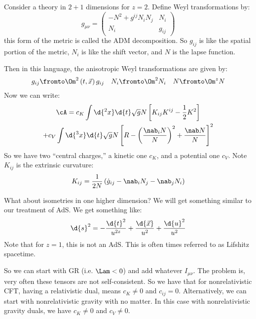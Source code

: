 \documentclass{booc}
\begin{document}
\begin{exm}
Consider a theory in $2+1$ dimensions for $z = 2$. 
Define Weyl transformations by:
\begin{equation}
g_{\mu\nu}= 
\begin{pmatrix}
-N^2 + g^{ij} N_i N_j & N_i \\
N_i & g_{ij}
\end{pmatrix}
\end{equation}
this form of the metric is called the ADM decomposition.
So $g_{ij}$ is like the spatial portion of the metric, $N_i$ is like the shift vector,
and $N$ is the lapse function.

Then in this language, the anisotropic Weyl transformations are given by:
\begin{align}
g_{ij} \fromto \Om^2\left( t , \vec{x} \right) g_{ij}
&&
N_i \fromto \Om^2 N_i 
&&
N \fromto \Om^z N
\end{align}
Now we can write:
\begin{multline*}
\cA = c_K \int \d{^2 x} \d{t} \sqrt{g} N \left[ K_{ij} K^{ij} - \frac{1}{2} K^2 \right] \\
+ c_V \int \d{^3 x} \d{t}\sqrt{g}N\left[ R - \left( \frac{\nab _i N}{N} \right)^2 + 
\frac{\nab N}{N}\right]^2
\end{multline*}
So we have two ``central charges,'' a kinetic one $c_K$, and a potential one $c_V$.
Note $K_{ij}$ is the extrinsic curvature:
\begin{equation}
K_{ij} = \frac{1}{2N} \left( \dot g_{ij} - \nab_i N_j - \nab_j N_i \right)
\end{equation}

What about isometries in one higher dimension?
We will get something similar to our treatment of AdS.
We get something like:
\begin{equation}
\d{s}^2 = -\frac{\d{t}^2}{u^{2z}} + \frac{\d{\vec{x}}}{u^2} + 
\frac{\d{u}^2}{u^2}
\end{equation}
Note that for $z= 1$, this is not an AdS.
This is often times referred to as Lifshitz spacetime.

So we can start with GR (i.e. $\Lam < 0$) and add whatever $I_{\mu\nu}$. 
The problem is, very often these tensors are not self-consistent. 
So we have that for nonrelativistic CFT, having a relativistic dual, means $c_K\neq 0$
and $c_{ij} = 0$. 
Alternatively, we can start with nonrelativistic gravity with no matter.
In this case with nonrelativistic gravity duals, we have $c_K \neq 0$ and $c_V\neq 0$. 
\end{exm}
\end{document}
